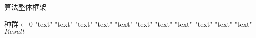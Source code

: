 \documentclass[11pt]{article}
\begin{document}
\begin{CJK*}{UTF8}{gkai}
\begin{algorithm}
\caption{算法整体框架}
\begin{algorithmic}[1] %
\State $种群 \gets 0$
  "text"   \EndIf
\State
   "text"   
\Else   "text"    
\EndIf\State                
     "text"   
   "text"       
\Else   "text"  
\EndIf\State
   "text"   \EndFor\State
  "text"  \EndFor\State
  "text"  \EndWhile\State
\Repeat "text"  \State
\Loop "text"  \EndLoop\State
\Return $Result$
\EndFunction
\end{algorithmic}
\end{algorithm}
\end{CJK*}
\end{document}
